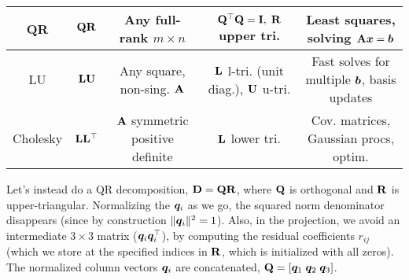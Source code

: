 \documentclass[11pt]{article}
\begin{document}
\begin{enumerate}
\begin{center}
{\begin{tabular}{|c|c|c|c|c|}
                      \hline
                      QR                                                       &
                      $\mathbf{Q} \mathbf{R}$                                        &
                      Any full-rank $m \times n$                               &
                      $\mathbf{Q}^\top \mathbf{Q} = \mathbf{I}, \; \mathbf{R}$ upper tri.  &
                      Least squares, solving $\mathbf{A}\bm{x}=\bm{b}$                                                                  \\
                      \hline
                      LU                                                       &
                      $\mathbf{L} \mathbf{U}$                                        &
                      Any square, non-sing. $\mathbf{A}$                          &
                      $\mathbf{L}$ l-tri. (unit diag.), $\mathbf{U}$ u-tri.          &
                      Fast solves for multiple $\bm{b}$, basis updates                                                                 \\
                      \hline
                      Cholesky                                                 &
                      $\mathbf{L} \mathbf{L}^\top$                                   &
                      $\mathbf{A}$ symmetric positive definite                    &
                      $\mathbf{L}$ lower tri.                                     &
                      Cov. matrices, Gaussian procs, optim.                                                                              \\
                      \hline
                  \end{tabular}%
              }
          \end{center}

          \pagebreak

          Let's instead do a QR decomposition, $\mathbf{D} = \mathbf{Q} \mathbf{R}$, where $\mathbf{Q}$ is
          orthogonal and $\mathbf{R}$ is upper-triangular.  Normalizing the $\bm{q}_i$ as we go, the
          squared norm denominator disappears (since by construction $\lVert\bm{q}_i\rVert^2 = 1$).
          Also, in the projection, we avoid an intermediate $3 \times 3$ matrix ($\bm{q}_i
              \bm{q}_i^\top$), by computing the residual coefficients $r_{ij}$ (which we store at the
          specified indices in $\mathbf{R}$, which is initialized with all zeros).  The normalized
          column vectors $\bm{q}_i$ are concatenated, $\mathbf{Q} = [ \bm{q}_1 \; \bm{q}_2 \;
              \bm{q}_3 ]$.


\end{enumerate}
\end{document}
